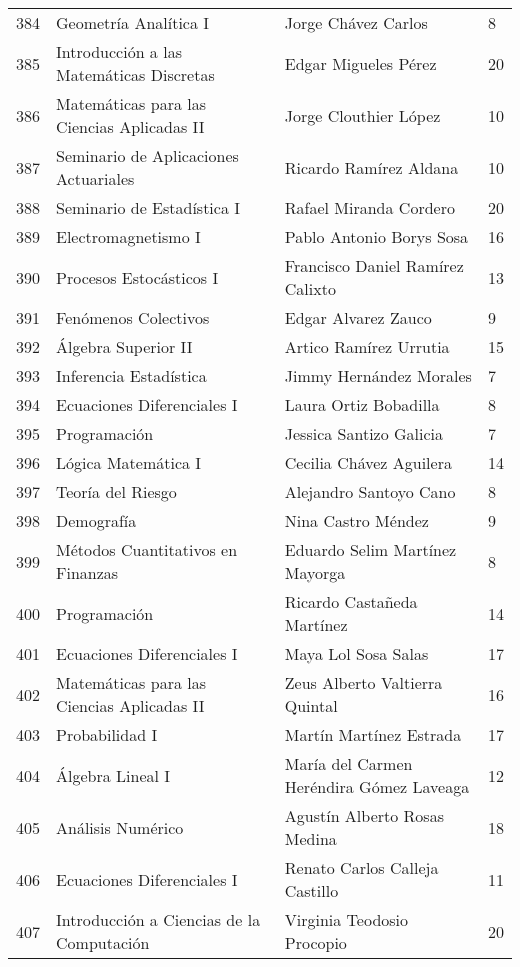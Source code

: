 \begin{table}[ht]
\begin{tabular}{rlll}
  384 & Geometría Analítica I & Jorge Chávez Carlos & 8 \\ 
  385 & Introducción a las Matemáticas Discretas & Edgar Migueles Pérez & 20 \\ 
  386 & Matemáticas para las Ciencias Aplicadas II & Jorge Clouthier López & 10 \\ 
  387 & Seminario de Aplicaciones Actuariales & Ricardo Ramírez Aldana & 10 \\ 
  388 & Seminario de Estadística I & Rafael Miranda Cordero & 20 \\ 
  389 & Electromagnetismo I & Pablo Antonio Borys Sosa & 16 \\ 
  390 & Procesos Estocásticos I & Francisco Daniel Ramírez Calixto & 13 \\ 
  391 & Fenómenos Colectivos & Edgar Alvarez Zauco & 9 \\ 
  392 & Álgebra Superior II & Artico Ramírez Urrutia & 15 \\ 
  393 & Inferencia Estadística & Jimmy Hernández Morales & 7 \\ 
  394 & Ecuaciones Diferenciales I & Laura Ortiz Bobadilla & 8 \\ 
  395 & Programación & Jessica Santizo Galicia & 7 \\ 
  396 & Lógica Matemática I & Cecilia Chávez Aguilera & 14 \\ 
  397 & Teoría del Riesgo & Alejandro Santoyo Cano & 8 \\ 
  398 & Demografía & Nina Castro Méndez & 9 \\ 
  399 & Métodos Cuantitativos en Finanzas & Eduardo Selim Martínez Mayorga & 8 \\ 
  400 & Programación & Ricardo Castañeda Martínez & 14 \\ 
  401 & Ecuaciones Diferenciales I & Maya Lol Sosa Salas & 17 \\ 
  402 & Matemáticas para las Ciencias Aplicadas II & Zeus Alberto Valtierra Quintal & 16 \\ 
  403 & Probabilidad I & Martín Martínez Estrada & 17 \\ 
  404 & Álgebra Lineal I & María del Carmen Heréndira Gómez Laveaga & 12 \\ 
  405 & Análisis Numérico & Agustín Alberto Rosas Medina & 18 \\ 
  406 & Ecuaciones Diferenciales I & Renato Carlos Calleja Castillo & 11 \\ 
  407 & Introducción a Ciencias de la Computación & Virginia Teodosio Procopio & 20 \\ 

\end{tabular}
\end{table}
